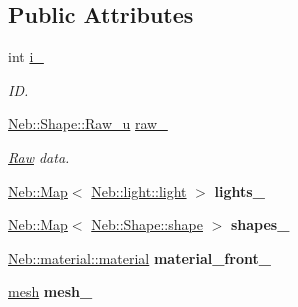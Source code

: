 \subsection*{\-Public \-Attributes}
\begin{DoxyCompactItemize}
\item 
\hypertarget{classNeb_1_1Shape_1_1shape_a4ea8904ea7cb02b3580586d23ef65736}{int \hyperlink{classNeb_1_1Shape_1_1shape_a4ea8904ea7cb02b3580586d23ef65736}{i\-\_\-}}\label{classNeb_1_1Shape_1_1shape_a4ea8904ea7cb02b3580586d23ef65736}

\begin{DoxyCompactList}\small\item\em \-I\-D. \end{DoxyCompactList}\item 
\hypertarget{classNeb_1_1Shape_1_1shape_a106c15be1906384e872874a999c1a773}{\hyperlink{classNeb_1_1unique__ptr}{\-Neb\-::\-Shape\-::\-Raw\-\_\-u} \hyperlink{classNeb_1_1Shape_1_1shape_a106c15be1906384e872874a999c1a773}{raw\-\_\-}}\label{classNeb_1_1Shape_1_1shape_a106c15be1906384e872874a999c1a773}

\begin{DoxyCompactList}\small\item\em \hyperlink{classNeb_1_1Shape_1_1Raw}{\-Raw} data. \end{DoxyCompactList}\item 
\hypertarget{classNeb_1_1Shape_1_1shape_a3070b9f1cecd871b3bf0febbef8de711}{\hyperlink{classNeb_1_1Map}{\-Neb\-::\-Map}$<$ \hyperlink{classNeb_1_1light_1_1light}{\-Neb\-::light\-::light} $>$ {\bfseries lights\-\_\-}}\label{classNeb_1_1Shape_1_1shape_a3070b9f1cecd871b3bf0febbef8de711}

\item 
\hypertarget{classNeb_1_1Shape_1_1shape_a880326855a69925260706d175a1ccccc}{\hyperlink{classNeb_1_1Map}{\-Neb\-::\-Map}$<$ \hyperlink{classNeb_1_1Shape_1_1shape}{\-Neb\-::\-Shape\-::shape} $>$ {\bfseries shapes\-\_\-}}\label{classNeb_1_1Shape_1_1shape_a880326855a69925260706d175a1ccccc}

\item 
\hypertarget{classNeb_1_1Shape_1_1shape_a02bd5170774b0217748d01376795e50d}{\hyperlink{classNeb_1_1material_1_1material}{\-Neb\-::material\-::material} {\bfseries material\-\_\-front\-\_\-}}\label{classNeb_1_1Shape_1_1shape_a02bd5170774b0217748d01376795e50d}

\item 
\hypertarget{classNeb_1_1Shape_1_1shape_af4ece0a2eed3386efae772a88a53b757}{\hyperlink{classNeb_1_1mesh}{mesh} {\bfseries mesh\-\_\-}}\label{classNeb_1_1Shape_1_1shape_af4ece0a2eed3386efae772a88a53b757}


\end{DoxyCompactItemize}
